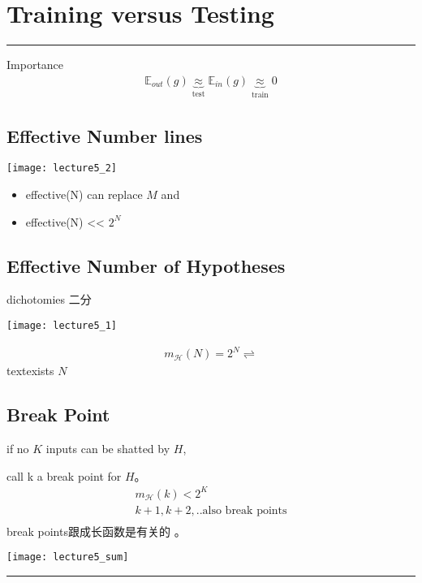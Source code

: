 \section{Training versus Testing} %
\noindent
{\color{LightRubineRed} \rule{\linewidth}{1mm} }
\begin{bclogo}{Importance}
\begin{align*}
\mathbb{E}_{out}(g) \underbrace{\approx}_{\text{test}} \mathbb{E}_{in}(g) \underbrace{\approx}_{\text{train}} 0
\end{align*}
\end{bclogo}
\subsection{Effective Number lines} %
\label{sub:effective_number_lines}
\begin{center}
\texttt{[image: lecture5\_2]}\\
\end{center}
\begin{itemize}
	\item effective(N) can replace $M$ and
	\item effective(N) << $2^N$
\end{itemize}
\subsection{Effective Number of Hypotheses}
dichotomies 二分 \par
\begin{center}
\texttt{[image: lecture5\_1]}\\
\end{center}
\begin{align*}
m_{\mathcal{H}}(N)=2^N \rightleftharpoons 
\end{align*}
text{exists} $N$ 

\subsection{Break Point}
if no $K$ inputs can be shatted by $H$, \par
call k a break point for $H$。
\begin{align}
m_{\mathcal{H}}(k) < 2^K \\
k+1,k+2,.. \text{also break points} \\
\end{align}
break points跟成长函数是有关的 。 \\

\begin{center}
\texttt{[image: lecture5\_sum]}\\
\end{center}
\noindent
{\color{RubineRed} \rule{\linewidth}{1mm} }